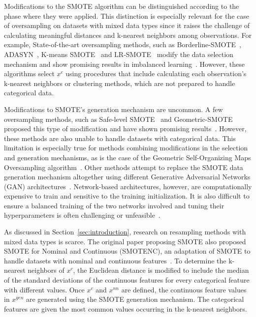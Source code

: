 \documentclass[preprint,12pt]{elsarticle}
\begin{document}
{Modifications to the SMOTE algorithm can be distinguished according to the
phase where they were applied. This distinction is especially relevant for the
case of oversampling on datasets with mixed data types since it raises the
challenge of calculating meaningful distances and k-nearest neighbors among
observations. For example, State-of-the-art oversampling methods, such as
Borderline-SMOTE~\cite{han2005borderline}, ADASYN~\cite{he2008adasyn}, K-means
SMOTE~\cite{douzas2018improving} and LR-SMOTE~\cite{liang2020lr} modify the
data selection mechanism and show promising results in imbalanced
learning~\cite{fonseca2021improving}. However, these algorithms select $x^c$
using procedures that include calculating each observation's k-nearest
neighbors or clustering methods, which are not prepared to handle categorical
data.

Modifications to SMOTE's generation mechanism are uncommon. A few oversampling
methods, such as Safe-level SMOTE~\cite{bunkhumpornpat2009safe} and
Geometric-SMOTE~\cite{douzas2019geometric} proposed this type of modification
and have shown promising results~\cite{douzas2019imbalanced}. However, these
methods are also unable to handle datasets with categorical data. This
limitation is especially true for methods combining modifications in the
selection and generation mechanisms, as is the case of the Geometric
Self-Organizing Maps Oversampling algorithm~\cite{douzas2021g}. Other methods
attempt to replace the SMOTE data generation mechanism altogether using
different Generative Adversarial Networks (GAN)
architectures~\cite{salazar2021generative, koivu2020synthetic, jo2022obgan}.
Network-based architectures, however, are computationally expensive to train
and sensitive to the training initialization. It is also difficult to ensure a
balanced training of the two networks involved and tuning their
hyperparameters is often challenging or unfeasible~\cite{gonog2019review}. 

As discussed in Section~\ref{sec:introduction}, research on resampling methods
with mixed data types is scarce. The original paper proposing SMOTE also
proposed SMOTE for Nominal and Continuous (SMOTENC), an adaptation of SMOTE to
handle datasets with nominal and continuous features~\cite{Chawla2002}. To
determine the k-nearest neighbors of $x^c$, the Euclidean distance is modified
to include the median of the standard
deviations of the continuous features for every categorical feature with
different values. Once $x^c$ and $x^{nn}$ are defined,  
the continuous feature values in $x^{gen}$ are generated using the SMOTE generation
mechanism. The categorical features are given the most common values
occurring in the k-nearest neighbors.

}
\end{document}
